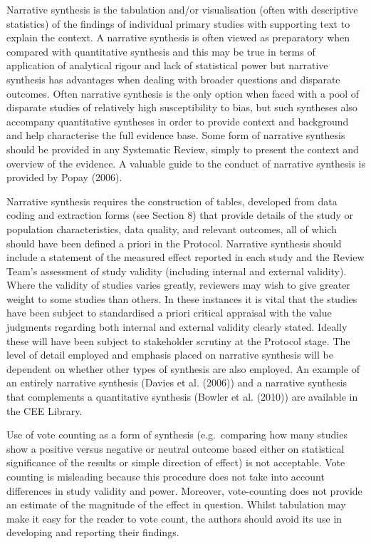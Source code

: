 \documentclass[
  letterpaper,
  DIV=11,
  numbers=noendperiod]{scrreprt}
\begin{document}
Narrative synthesis is the tabulation and/or visualisation (often with
descriptive statistics) of the findings of individual primary studies
with supporting text to explain the context. A narrative synthesis is
often viewed as preparatory when compared with quantitative synthesis
and this may be true in terms of application of analytical rigour and
lack of statistical power but narrative synthesis has advantages when
dealing with broader questions and disparate outcomes. Often narrative
synthesis is the only option when faced with a pool of disparate studies
of relatively high susceptibility to bias, but such syntheses also
accompany quantitative syntheses in order to provide context and
background and help characterise the full evidence base. Some form of
narrative synthesis should be provided in any Systematic Review, simply
to present the context and overview of the evidence. A valuable guide to
the conduct of narrative synthesis is provided by Popay (2006).

Narrative synthesis requires the construction of tables, developed from
data coding and extraction forms (see Section 8) that provide details of
the study or population characteristics, data quality, and relevant
outcomes, all of which should have been defined a priori in the
Protocol. Narrative synthesis should include a statement of the measured
effect reported in each study and the Review Team's assessment of study
validity (including internal and external validity). Where the validity
of studies varies greatly, reviewers may wish to give greater weight to
some studies than others. In these instances it is vital that the
studies have been subject to standardised a priori critical appraisal
with the value judgments regarding both internal and external validity
clearly stated. Ideally these will have been subject to stakeholder
scrutiny at the Protocol stage. The level of detail employed and
emphasis placed on narrative synthesis will be dependent on whether
other types of synthesis are also employed. An example of an entirely
narrative synthesis (Davies et al. (2006)) and a narrative synthesis
that complements a quantitative synthesis (Bowler et al. (2010)) are
available in the CEE Library.

Use of vote counting as a form of synthesis (e.g.~comparing how many
studies show a positive versus negative or neutral outcome based either
on statistical significance of the results or simple direction of
effect) is not acceptable. Vote counting is misleading because this
procedure does not take into account differences in study validity and
power. Moreover, vote-counting does not provide an estimate of the
magnitude of the effect in question. Whilst tabulation may make it easy
for the reader to vote count, the authors should avoid its use in
developing and reporting their findings.
\end{document}
